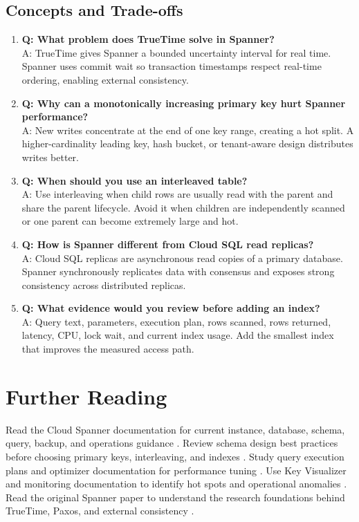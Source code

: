 \subsection{Concepts and Trade-offs}
\begin{enumerate}
    \item \textbf{Q: What problem does TrueTime solve in Spanner?}\\
    A: TrueTime gives Spanner a bounded uncertainty interval for real time. Spanner uses commit wait so transaction timestamps respect real-time ordering, enabling external consistency.

    \item \textbf{Q: Why can a monotonically increasing primary key hurt Spanner performance?}\\
    A: New writes concentrate at the end of one key range, creating a hot split. A higher-cardinality leading key, hash bucket, or tenant-aware design distributes writes better.

    \item \textbf{Q: When should you use an interleaved table?}\\
    A: Use interleaving when child rows are usually read with the parent and share the parent lifecycle. Avoid it when children are independently scanned or one parent can become extremely large and hot.

    \item \textbf{Q: How is Spanner different from Cloud SQL read replicas?}\\
    A: Cloud SQL replicas are asynchronous read copies of a primary database. Spanner synchronously replicates data with consensus and exposes strong consistency across distributed replicas.

    \item \textbf{Q: What evidence would you review before adding an index?}\\
    A: Query text, parameters, execution plan, rows scanned, rows returned, latency, CPU, lock wait, and current index usage. Add the smallest index that improves the measured access path.
\end{enumerate}

\section{Further Reading}
Read the Cloud Spanner documentation for current instance, database, schema, query, backup, and operations guidance \cite{googlecloudspannerdocs}. Review schema design best practices before choosing primary keys, interleaving, and indexes \cite{googlecloudspannerschemadocs}. Study query execution plans and optimizer documentation for performance tuning \cite{googlecloudspannerquerydocs}. Use Key Visualizer and monitoring documentation to identify hot spots and operational anomalies \cite{googlecloudspannerkeyvisualizer}. Read the original Spanner paper to understand the research foundations behind TrueTime, Paxos, and external consistency \cite{corbett2012spanner}.

